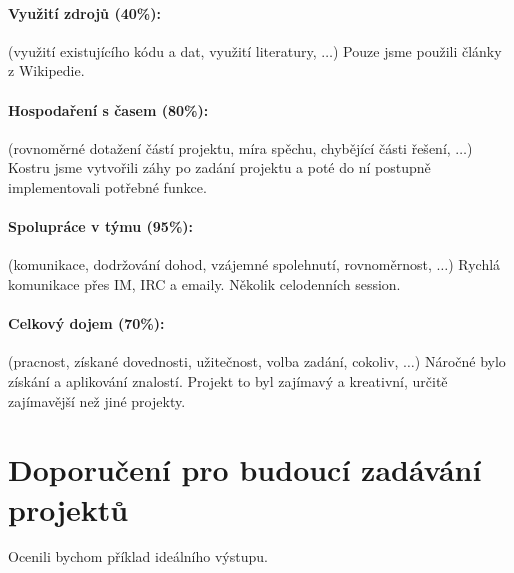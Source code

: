 \documentclass[11pt,a4paper]{article}
\begin{document}
\paragraph{Využití zdrojů (40\%):} (využití existujícího kódu a dat, využití
literatury, $\ldots$)
Pouze jsme použili články z Wikipedie.

\paragraph{Hospodaření s časem (80\%):} (rovnoměrné dotažení částí projektu,
míra spěchu, chybějící části řešení, $\ldots$)
Kostru jsme vytvořili záhy po zadání projektu a poté do ní postupně implementovali potřebné funkce.

\paragraph{Spolupráce v týmu (95\%):} (komunikace, dodržování dohod, vzájemné
spolehnutí, rovnoměrnost, $\ldots$)
Rychlá komunikace přes IM, IRC a emaily. Několik celodenních session.

\paragraph{Celkový dojem (70\%):} (pracnost, získané dovednosti, užitečnost,
volba zadání, cokoliv, $\ldots$)
Náročné bylo získání a aplikování znalostí. Projekt to byl zajímavý a kreativní, určitě zajímavější než jiné projekty.

\section{Doporučení pro budoucí zadávání projektů}


Ocenili bychom příklad ideálního výstupu.

%
\end{document}

